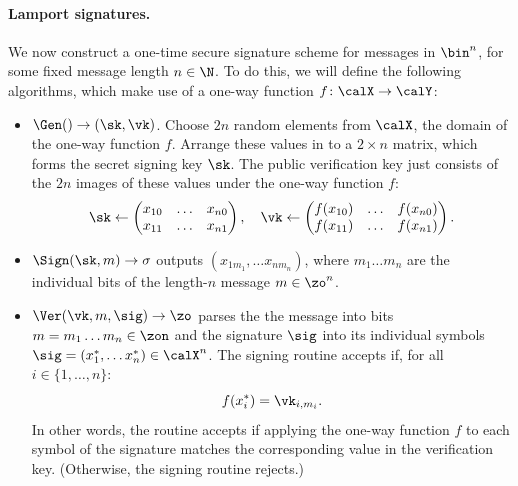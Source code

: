 \paragraph{Lamport signatures.}
We now construct a one-time secure signature scheme for messages in $\bin^n$,
for some fixed message length $n \in \N$. 
To do this, we will define the following algorithms, which make use of a
one-way function $f \colon \calX \to \calY$:
\begin{itemize}
  \item $\Gen() \to (\sk, \vk)$. 
    Choose $2n$ random elements from $\calX$,
    the domain of the one-way function $f$.
    Arrange these values in to a $2 \times n$
    matrix, which forms the secret signing key $\sk$.
    The public verification key just consists of the $2n$
    images of these values under the one-way function $f$:
\[ \sk \gets \begin{pmatrix}
	x_{10} & \ldots & x_{n0} \\
	x_{11} & \ldots & x_{n1} \\
	\end{pmatrix},\quad \vk \gets \begin{pmatrix}
	f(x_{10}) & \ldots & f(x_{n0}) \\
	f(x_{11}) & \ldots & f(x_{n1}) \\
\end{pmatrix}.\]
	\item $\Sign(\sk, m) \to \sigma$ outputs $(x_{1m_1}, \ldots x_{nm_n})$, where $m_1 \dots m_n$ 
    are the individual bits of the length-$n$ message $m \in \zo^n$.
	\item $\Ver(\vk, m, \sig) \to \zo$ parses the 
    the message into bits $m = m_1\dots m_n \in \zon$ and
    the signature $\sig$ into its individual symbols $\sig = (x_1^*, \ldots x_n^*) \in \calX^n$.
    The signing routine accepts if, for all $i \in \{1, \dots, n\}$:
    \begin{equation}
      f(x^*_i) = \vk_{i,m_i}.\label{eq:lamport}
    \end{equation}
    In other words, the routine accepts if applying the one-way function $f$ to each symbol
    of the signature matches the corresponding value in the verification key.
    (Otherwise, the signing routine rejects.)
\end{itemize}


